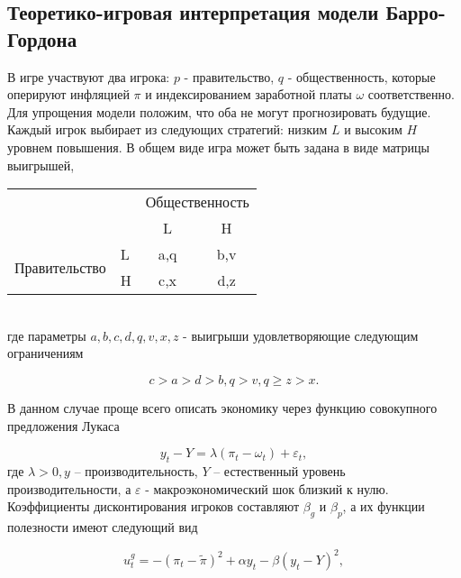 
\subsection{Теоретико-игровая интерпретация модели Барро-Гордона}

В игре участвуют два игрока: $p$ - правительство, $q$ - общественность, которые оперируют инфляцией $\pi$  и индексированием заработной платы $\omega$ соответственно. Для упрощения модели положим, что оба не могут прогнозировать будущие. Каждый игрок выбирает из следующих стратегий: низким $L$  и высоким  $H$ уровнем повышения. В общем виде игра может быть задана в виде матрицы выигрышей, 
\begin{table}[h]
	\centering
\begin{tabular}{|l|l|c|c|}
	\hline
	\multicolumn{2}{|l|}{\multirow{2}{*}{}} & \multicolumn{2}{l|}{Общественность} \\ \cline{3-4} 
	\multicolumn{2}{|l|}{}                  & L                & H                \\ \hline
	\multirow{2}{*}{Правительство}    & L   & a,q              & b,v              \\ \cline{2-4} 
	& H   & c,x              & d,z              \\ \hline
\end{tabular}
\end{table}\\
где параметры $a,b,c,d,q,v,x,z$  - выигрыши удовлетворяющие следующим ограничениям~\cite{libich2008macroeconomic}

\begin{equation}
c>a>d>b, q>v, q\geqslant z>x.
\label{eq:sec:ot:restrictions}
\end{equation}

В данном случае проще всего описать экономику через функцию совокупного предложения Лукаса~\cite{libichIncorpo}

\begin{equation}
\label{eq:sec:ot:lucas}
y_t - Y = \lambda(\pi_t - \omega_t)+\varepsilon_t,
\end{equation}
где  $\lambda>0, y$  – производительность, $Y$ – естественный уровень производительности, а  $\varepsilon$ - макроэкономический шок близкий к нулю. Коэффициенты дисконтирования игроков составляют $\beta_g$ и $\beta_p$, а их функции  полезности  имеют следующий вид 

\begin{equation}
\label{eq:sec:ot:govUtil}
u^g_t=-(\pi_t - \tilde{\pi})^2 + \alpha y_t - \beta(y_t-Y)^2,
\end{equation}

